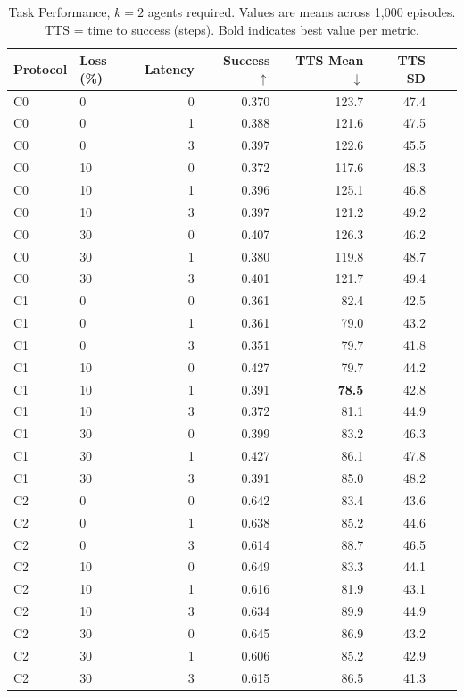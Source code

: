 \documentclass[pdflatex,sn-mathphys-num]{sn-jnl}%
\theoremstyle{thmstyleone}%
\theoremstyle{thmstyletwo}%
\theoremstyle{thmstylethree}%
\begin{document}
\begin{appendices}
\begin{table}[htbp]
\centering
\caption{Task Performance, $k=2$ agents required. Values are means across 1,000 episodes. TTS = time to success (steps). Bold indicates best value per metric.}
\label{tab:appendix_task_a}
\small
\begin{tabular}{llrrrrrr}
\toprule
Protocol & Loss (\%) & Latency & Success $\uparrow$ & TTS Mean $\downarrow$ & TTS SD \\
\midrule
C0 & 0 & 0 & 0.370 & 123.7 & 47.4 \\
C0 & 0 & 1 & 0.388 & 121.6 & 47.5 \\
C0 & 0 & 3 & 0.397 & 122.6 & 45.5 \\
C0 & 10 & 0 & 0.372 & 117.6 & 48.3 \\
C0 & 10 & 1 & 0.396 & 125.1 & 46.8 \\
C0 & 10 & 3 & 0.397 & 121.2 & 49.2 \\
C0 & 30 & 0 & 0.407 & 126.3 & 46.2 \\
C0 & 30 & 1 & 0.380 & 119.8 & 48.7 \\
C0 & 30 & 3 & 0.401 & 121.7 & 49.4 \\
\addlinespace[4pt]
C1 & 0 & 0 & 0.361 & 82.4 & 42.5 \\
C1 & 0 & 1 & 0.361 & 79.0 & 43.2 \\
C1 & 0 & 3 & 0.351 & 79.7 & 41.8 \\
C1 & 10 & 0 & 0.427 & 79.7 & 44.2 \\
C1 & 10 & 1 & 0.391 & \textbf{78.5} & 42.8 \\
C1 & 10 & 3 & 0.372 & 81.1 & 44.9 \\
C1 & 30 & 0 & 0.399 & 83.2 & 46.3 \\
C1 & 30 & 1 & 0.427 & 86.1 & 47.8 \\
C1 & 30 & 3 & 0.391 & 85.0 & 48.2 \\
\addlinespace[4pt]
C2 & 0 & 0 & 0.642 & 83.4 & 43.6 \\
C2 & 0 & 1 & 0.638 & 85.2 & 44.6 \\
C2 & 0 & 3 & 0.614 & 88.7 & 46.5 \\
C2 & 10 & 0 & 0.649 & 83.3 & 44.1 \\
C2 & 10 & 1 & 0.616 & 81.9 & 43.1 \\
C2 & 10 & 3 & 0.634 & 89.9 & 44.9 \\
C2 & 30 & 0 & 0.645 & 86.9 & 43.2 \\
C2 & 30 & 1 & 0.606 & 85.2 & 42.9 \\
C2 & 30 & 3 & 0.615 & 86.5 & 41.3 \\

\end{tabular}
\end{table}
\end{appendices}
\end{document}
